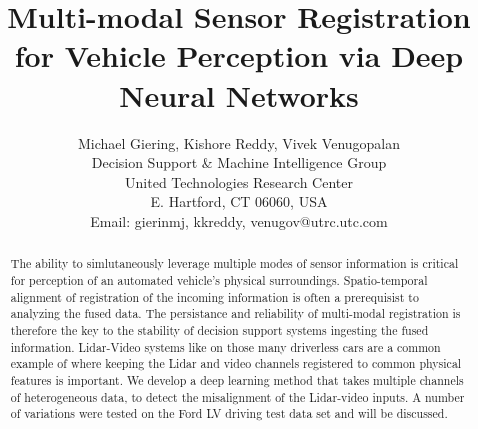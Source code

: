 \documentclass{article}
\title{Multi-modal Sensor Registration for Vehicle Perception via Deep Neural Networks}
\author{Michael Giering, Kishore Reddy, Vivek Venugopalan\\
Decision Support \& Machine Intelligence Group \\
United Technologies Research Center\\
E. Hartford, CT 06060, USA \\
Email: {gierinmj, kkreddy, venugov}@utrc.utc.com}
\begin{document}
\maketitle

\begin{abstract}


The ability to simlutaneously leverage multiple modes of sensor information is critical for perception of an automated vehicle's physical surroundings. Spatio-temporal alignment of registration of the incoming information is often a prerequisist to analyzing the fused data. The persistance and reliability of multi-modal registration is therefore the key to the stability of decision support systems ingesting the fused information. Lidar-Video systems like on those many driverless cars are a common example of where keeping the Lidar and video channels registered to common physical features is important. We develop a deep learning method that takes multiple channels of heterogeneous data, to detect the misalignment of the Lidar-video inputs. A number of variations were tested on the Ford LV driving test data set and will be discussed. 

\end{abstract}

\end{document}
